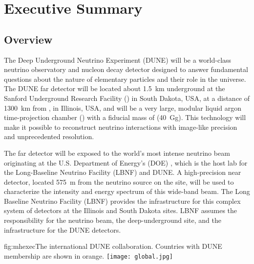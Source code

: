 \chapter{Executive Summary }
\label{ch:project-overview}
\section{Overview}
The Deep Underground Neutrino Experiment (DUNE) will be a world-class neutrino observatory and nucleon decay detector designed
to answer fundamental questions about the nature of elementary particles and their role in the universe. 
The DUNE far detector will be located about \SI{1.5}{km} underground at the Sanford Underground Research Facility (\surf) in South Dakota, USA, at a distance of \SI{1300}{\km} from \fnal, in Illinois, USA, and
will be a very large, modular liquid argon time-projection chamber (\lartpc) with a fiducial mass of \fdfiducialmass (\SI{40}{\giga\gram}). 
This \lar  technology will make it possible to reconstruct neutrino interactions with image-like precision
and unprecedented resolution.

The far detector will be exposed to
the world's most intense neutrino beam originating at the U.S. Department of Energy's (DOE)   \fnal{}, which is the host lab for the Long-Baseline Neutrino Facility (LBNF) and DUNE.  
A high-precision near detector, located \SI{575}{m} from the neutrino source on the  \fnal site, will be used to characterize the intensity and energy spectrum of this wide-band beam. 
The Long Baseline Neutrino Facility (LBNF) provides the infrastructure for this complex system of detectors at the Illinois and South Dakota sites. %
LBNF assumes the responsibility for the neutrino beam, 
the deep-underground site, and the infrastructure for the DUNE detectors.


\begin{dunefigure}{fig:mhexec}{The international DUNE
collaboration. Countries with DUNE membership are shown in orange.}
\texttt{[image: global.jpg]}
\label{fig:map}
\end{dunefigure}

